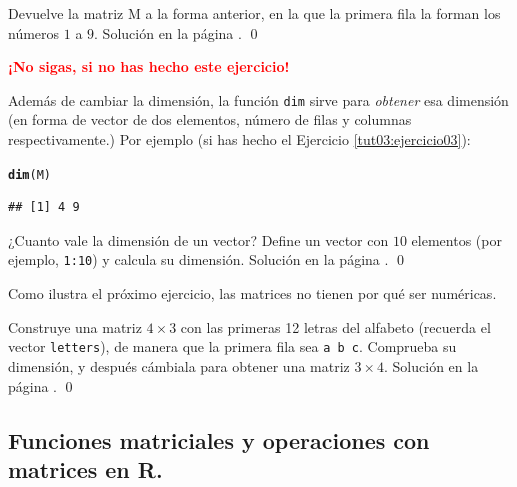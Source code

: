 \documentclass[10pt,a4paper]{article}\usepackage[]{graphicx}\usepackage[]{color}
\makeatletter
\newcommand{\hlstd}[1]{\textcolor[rgb]{0.345,0.345,0.345}{#1}}%
\newcommand{\hlkwd}[1]{\textcolor[rgb]{0.737,0.353,0.396}{\textbf{#1}}}%
\newenvironment{kframe}{%
 \def\at@end@of@kframe{}%
 \ifinner\ifhmode%
  \def\at@end@of@kframe{\end{minipage}}%
  \begin{minipage}{\columnwidth}%
 \fi\fi%
 \def\FrameCommand##1{\hskip\@totalleftmargin \hskip-\fboxsep
 \colorbox{shadecolor}{##1}\hskip-\fboxsep
     \hskip-\linewidth \hskip-\@totalleftmargin \hskip\columnwidth}%
 \MakeFramed {\advance\hsize-\width
   \@totalleftmargin\z@ \linewidth\hsize
   \@setminipage}}%
 {\par\unskip\endMakeFramed%
 \at@end@of@kframe}
\newenvironment{knitrout}{}{} %
\makeatother
\begin{document}
\begin{ejercicio}
\label{tut03:ejercicio04}
\quad
Devuelve la matriz M a la forma anterior, en la que la primera fila la forman los números $1$ a $9$. Solución en la página \pageref{tut03:ejercicio04:sol}.
\qed
\end{ejercicio}

     \vspace{1cm}
\begin{center}
\textcolor{red}{\Large\bf  ¡No sigas, si no has hecho este ejercicio!}
\end{center}

Además de cambiar la dimensión, la función {\tt dim} sirve para {\em obtener} esa dimensión (en forma de vector de dos elementos, número de filas y columnas respectivamente.) Por ejemplo (si has hecho el Ejercicio \ref{tut03:ejercicio03}):
\begin{knitrout}
\color{fgcolor}\begin{kframe}
\begin{alltt}
\hlkwd{dim}\hlstd{(M)}
\end{alltt}
\begin{verbatim}
## [1] 4 9
\end{verbatim}
\end{kframe}
\end{knitrout}
     
     \begin{ejercicio}
\label{tut03:ejercicio05}
\quad
¿Cuanto vale la dimensión de un vector? Define un vector con $10$ elementos (por ejemplo, {\tt 1:10}) y calcula su dimensión.
Solución en la página \pageref{tut03:ejercicio05:sol}.
\qed
\end{ejercicio}

Como ilustra el próximo ejercicio, las matrices no tienen por qué ser numéricas.
\begin{ejercicio}
\label{tut03:ejercicio06}
\quad
Construye una matriz $4\times 3$ con las primeras 12 letras del alfabeto (recuerda el vector {\tt letters}), de manera que la primera fila sea {\tt a b c}. Comprueba su dimensión, y después cámbiala para obtener una matriz $3\times 4$.
Solución en la página \pageref{tut03:ejercicio06:sol}.
\qed
\end{ejercicio}


\subsection{Funciones matriciales y operaciones con matrices en R.}
\label{tut03:subsec:FuncionesMatricialesR}
\end{document}
